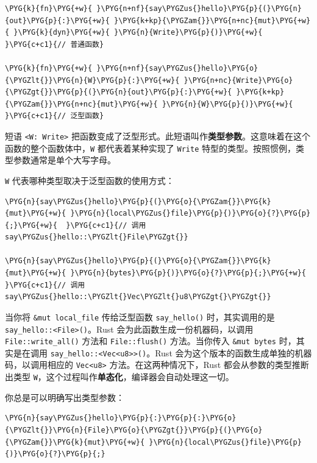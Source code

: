 \begin{Verbatim}[commandchars=\\\{\},breaklines=true,breakanywhere=true,fontsize=\codefont,xleftmargin=17bp]
\PYG{k}{fn}\PYG{+w}{ }\PYG{n+nf}{say\PYGZus{}hello}\PYG{p}{(}\PYG{n}{out}\PYG{p}{:}\PYG{+w}{ }\PYG{k+kp}{\PYGZam{}}\PYG{n+nc}{mut}\PYG{+w}{ }\PYG{k}{dyn}\PYG{+w}{ }\PYG{n}{Write}\PYG{p}{)}\PYG{+w}{     }\PYG{c+c1}{// 普通函数}

\PYG{k}{fn}\PYG{+w}{ }\PYG{n+nf}{say\PYGZus{}hello}\PYG{o}{\PYGZlt{}}\PYG{n}{W}\PYG{p}{:}\PYG{+w}{ }\PYG{n+nc}{Write}\PYG{o}{\PYGZgt{}}\PYG{p}{(}\PYG{n}{out}\PYG{p}{:}\PYG{+w}{ }\PYG{k+kp}{\PYGZam{}}\PYG{n+nc}{mut}\PYG{+w}{ }\PYG{n}{W}\PYG{p}{)}\PYG{+w}{   }\PYG{c+c1}{// 泛型函数}
\end{Verbatim}

短语 \texttt{<W: Write>} 把函数变成了泛型形式。此短语叫作\textbf{类型参数}。这意味着在这个函数的整个函数体中，\texttt{W} 都代表着某种实现了 \texttt{Write} 特型的类型。按照惯例，类型参数通常是单个大写字母。

\texttt{W} 代表哪种类型取决于泛型函数的使用方式：

\begin{Verbatim}[commandchars=\\\{\},breaklines=true,breakanywhere=true,fontsize=\codefont,xleftmargin=17bp]
\PYG{n}{say\PYGZus{}hello}\PYG{p}{(}\PYG{o}{\PYGZam{}}\PYG{k}{mut}\PYG{+w}{ }\PYG{n}{local\PYGZus{}file}\PYG{p}{)}\PYG{o}{?}\PYG{p}{;}\PYG{+w}{  }\PYG{c+c1}{// 调用say\PYGZus{}hello::\PYGZlt{}File\PYGZgt{}}

\PYG{n}{say\PYGZus{}hello}\PYG{p}{(}\PYG{o}{\PYGZam{}}\PYG{k}{mut}\PYG{+w}{ }\PYG{n}{bytes}\PYG{p}{)}\PYG{o}{?}\PYG{p}{;}\PYG{+w}{       }\PYG{c+c1}{// 调用say\PYGZus{}hello::\PYGZlt{}Vec\PYGZlt{}u8\PYGZgt{}\PYGZgt{}}
\end{Verbatim}

当你将 \texttt{\&mut local\_file} 传给泛型函数 \texttt{say\_hello()} 时，其实调用的是 \texttt{say\_hello::<File>()}。Rust 会为此函数生成一份机器码，以调用 \texttt{File::write\_all()} 方法和 \texttt{File::flush()} 方法。当你传入 \texttt{\&mut bytes} 时，其实是在调用 \texttt{say\_hello::<Vec<u8>>()}。Rust 会为这个版本的函数生成单独的机器码，以调用相应的 \texttt{Vec<u8>} 方法。在这两种情况下，Rust 都会从参数的类型推断出类型 \texttt{W}，这个过程叫作\textbf{单态化}，编译器会自动处理这一切。

你总是可以明确写出类型参数：

\begin{Verbatim}[commandchars=\\\{\},breaklines=true,breakanywhere=true,fontsize=\codefont,xleftmargin=17bp]
\PYG{n}{say\PYGZus{}hello}\PYG{p}{:}\PYG{p}{:}\PYG{o}{\PYGZlt{}}\PYG{n}{File}\PYG{o}{\PYGZgt{}}\PYG{p}{(}\PYG{o}{\PYGZam{}}\PYG{k}{mut}\PYG{+w}{ }\PYG{n}{local\PYGZus{}file}\PYG{p}{)}\PYG{o}{?}\PYG{p}{;}
\end{Verbatim}


